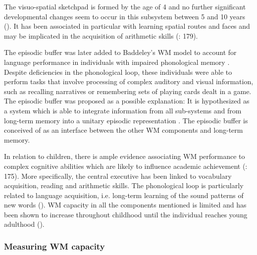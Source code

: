 \documentclass[output=paper]{langscibook}
\begin{document}
The visuo-spatial sketchpad is formed by the age of 4 and no further significant developmental changes seem to occur in this subsystem between 5 and 10 years (\citealt{HasselhornGrube2003}). It has been associated in particular with learning spatial routes and faces and may be implicated in the acquisition of arithmetic skills (\citealt{GathercolePickering2000}: 179). 

The episodic buffer was later added to Baddeley’s WM model to account for language performance in individuals with impaired phonological memory \citep{Baddeley2000}. Despite deficiencies in the phonological loop, these individuals were able to perform tasks that involve processing of complex auditory and visual information, such as recalling narratives or remembering sets of playing cards dealt in a game. The episodic buffer was proposed as a possible explanation: It is hypothesized as a system which is able to integrate information from all sub-systems and from long-term memory into a unitary episodic representation \citep[417]{Baddeley2000}. The episodic buffer is conceived of as an interface between the other WM components and long-term memory.

In relation to children, there is ample evidence associating WM performance to complex cognitive abilities which are likely to influence academic achievement (\citealt{GathercolePickering2000}: 175). More specifically, the central executive has been linked to vocabulary acquisition, reading and arithmetic skills. The phonological loop is particularly related to language acquisition, i.e. long-term learning of the sound patterns of new words (\citealt{GathercolePickering2000}). WM capacity in all the components mentioned is limited and has been shown to increase throughout childhood until the individual reaches young adulthood (\citealt{HasselhornGrube2003}). 

\subsubsection{Measuring WM capacity} %
\end{document}
